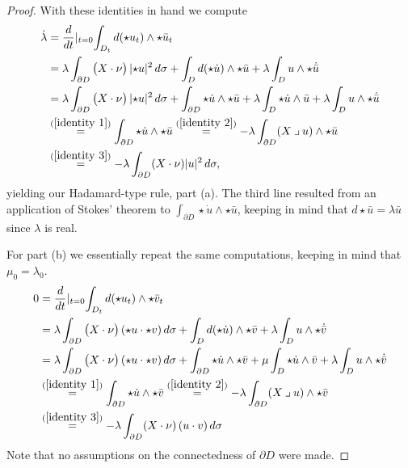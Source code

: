 \documentclass[11pt,reqno]{amsart}
\newcommand{\hodge}{\!\star\!}
\newcommand{\iprod}{\mathbin{\lrcorner}}
\begin{document}
\begin{proof}
With these identities in hand we compute
\begin{align*}
    \Dot{\lambda}&= \frac{d}{dt}\lvert_{t=0} \int_{ D_t}d(\star u_t)\wedge \star \bar u_t \\
    &= \lambda \int_{\partial  D}\big(X\cdot \nu\big) \, \lvert \star u\rvert^2 \, d\sigma + \int_{ D} d(\star \Dot{u})\wedge \star \bar u + \lambda \int_{ D} u\wedge \star \Dot{\bar u} \\
    &=\lambda \int_{\partial D}\big(X \cdot \nu\big) \, \lvert \star u\rvert^2 \,d\sigma + \int_{\partial  D} \star \Dot{u}\wedge \star \bar u + \lambda \int_D \star \dot u \wedge \bar u + \lambda \int_D u\wedge \star \Dot{\bar u}\\
    &\overset{(\ref{identity 1})}{=} \int_{\partial  D} \star \Dot{u} \wedge \star \bar u \overset{(\ref{identity 2})}{=} - \lambda \int_{\partial  D} (X \iprod u) \wedge \star\bar u \\
    &\overset{(\ref{identity 3})}{=} - \lambda\int_{ \partial D} (X\cdot \nu) \lvert u\rvert^2\,d\sigma,
\end{align*}
yielding our Hadamard-type rule, part (a). The third line resulted from an application of Stokes' theorem to $\int_{\partial D} \star \dot u \wedge \star \bar u$, keeping in mind that $d \hodge \bar u = \lambda \bar u$ since $\lambda$ is real.

For part (b) we essentially repeat the same computations, keeping in mind that $\mu_0=\lambda_0$.
\begin{align*}
    0&= \frac{d}{dt}\lvert_{t=0} \int_{ D_t}d(\star u_t)\wedge \star \bar v_t \\
    &= 
    \lambda \int_{\partial  D} \big(X\cdot \nu\big) \, (\star u \cdot \star v) \, d\sigma + \int_{ D} d(\star \Dot{u})\wedge \star \bar v + \lambda \int_{ D} u\wedge \star \Dot{\bar v} \\
    &= \lambda \int_{\partial  D} \big(X\cdot \nu\big) \, (\star u \cdot \star v) \, d\sigma + \int_{\partial  D} \star \Dot{u}\wedge \star \bar v + \mu \int_D \star \dot u\wedge \bar v + \lambda \int_D u\wedge \star \Dot{\bar v} \\
    &\overset{(\ref{identity 1})}{=} \int_{\partial  D} \star \Dot{u} \wedge \star \bar v \overset{(\ref{identity 2})}{=} - \lambda \int_{\partial  D} (X \iprod u) \wedge \star \bar v \\
    &\overset{(\ref{identity 3})}{=} - \lambda \int_{ \partial D} (X\cdot \nu) \, ( u \cdot v)\,d\sigma
\end{align*}
Note that no assumptions on the connectedness of $\partial D$ were made.
\end{proof}
\end{document}
